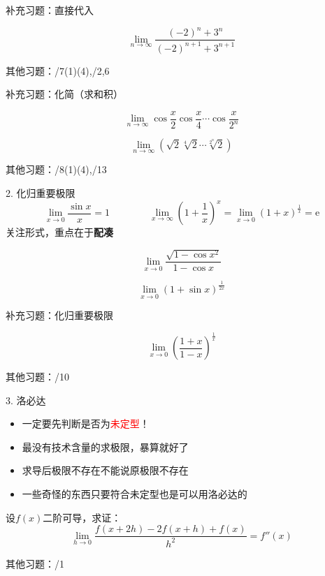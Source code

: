 \documentclass{myslide}
\begin{document}
\begin{frame}{补充习题：直接代入}
\begin{exercise}[\textsection 3.2/7(2)]
\[\lim_{n\to\infty}\frac{(-2)^n+3^n}{(-2)^{n+1}+3^{n+1}}\]
\end{exercise}
其他习题：/7(1)(4),/2,6
\end{frame}

\begin{frame}{补充习题：化简（求和积）}
\begin{exercise}[\textsection 3.3/13]
\[\lim_{n\to\infty}\cos\frac{x}{2}\cos\frac{x}{4}\cdots\cos\frac{x}{2^n}\]
\end{exercise}
\begin{exercise}[\textsection 3.2/8(7)]
\[\lim_{n\to\infty}(\sqrt{2}\sqrt[4]{2}\cdots\sqrt[2^n]{2})\]
\end{exercise}
其他习题：/8(1)(4),/13
\end{frame}

\begin{frame}{2. 化归重要极限}
\[\displaystyle\lim_{x\to 0}\frac{\sin x}{x}=1\qquad\qquad\lim_{x\to\infty}\left(1+\frac{1}{x}\right)^x=\lim_{x\to 0}(1+x)^{\frac{1}{x}}=\mathrm{e}\]
关注形式，重点在于\textbf{配凑}
\begin{example}[\textsection 3.3/10(9)]
\[\lim_{x\to 0}\frac{\sqrt{1-\cos x^2}}{1-\cos x}\]
\end{example}
\begin{example}[17数分期中]
\[\lim_{x\to 0}(1+\sin x)^{\frac{1}{2x}}\]
\end{example}
\end{frame}

\begin{frame}{补充习题：化归重要极限}
\begin{exercise}[\textsection 3.3/10(20)]
\[\lim_{x\to 0}\left(\frac{1+x}{1-x}\right)^{\frac{1}{x}}\]
\end{exercise}
其他习题：/10
\end{frame}

\begin{frame}{3. 洛必达}
\begin{itemize}
	\item 一定要先判断是否为\textcolor{red}{\Large 未定型}！
	\item 最没有技术含量的求极限，暴算就好了
	\item 求导后极限不存在不能说原极限不存在
	\item 一些奇怪的东西只要符合未定型也是可以用洛必达的
\end{itemize}
\begin{example}[\textsection 5.2/3]
设$f(x)$二阶可导，求证：
\[\lim_{h\to 0}\frac{f(x+2h)-2f(x+h)+f(x)}{h^2}=f''(x)\]
\end{example}
其他习题：/1
\end{frame}
\end{document}
